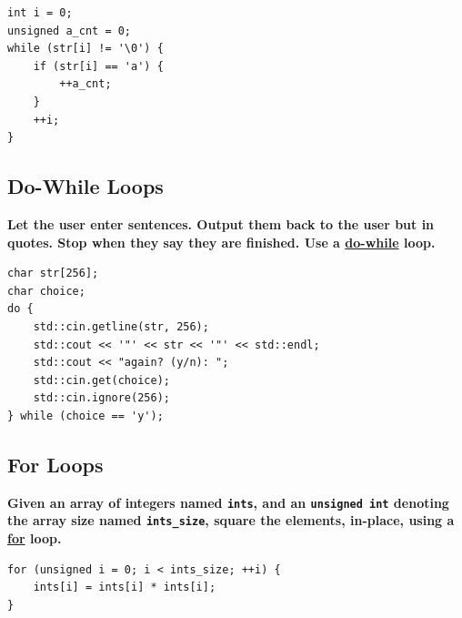 \documentclass[12pt, letterpaper]{article}
\newcommand{\question}[1]{\textbf{#1}\par}
\begin{document}
\begin{verbatim}
int i = 0;
unsigned a_cnt = 0;
while (str[i] != '\0') {
    if (str[i] == 'a') {
        ++a_cnt;
    }
    ++i;
}
\end{verbatim}

\subsection{Do-While Loops}
\question{Let the user enter sentences. Output them back to the user but in
quotes. Stop when they say they are finished. Use a \uline{do-while} loop.}

\begin{verbatim}
char str[256];
char choice;
do {
    std::cin.getline(str, 256);
    std::cout << '"' << str << '"' << std::endl;
    std::cout << "again? (y/n): ";
    std::cin.get(choice);
    std::cin.ignore(256);
} while (choice == 'y');
\end{verbatim}

\subsection{For Loops}
\begin{minipage}{\textwidth}
\question{Given an array of integers named \texttt{ints}, and an
\texttt{unsigned int} denoting the array size named \texttt{ints\_size}, square
the elements, in-place, using a \uline{for} loop.}

\begin{verbatim}
for (unsigned i = 0; i < ints_size; ++i) {
    ints[i] = ints[i] * ints[i];
}
\end{verbatim}
\end{minipage}
\end{document}
